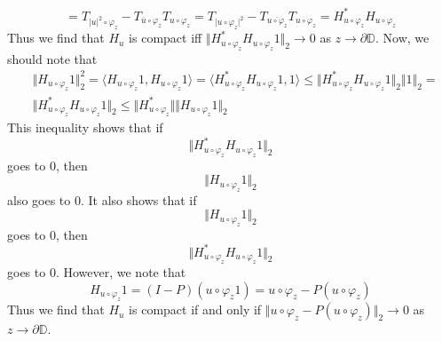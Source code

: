 \documentclass[12pt]{article}
\begin{document}
\[
= T_{\vert u \vert^2 \circ \varphi_z} - T_{\overline{u}\circ \varphi_z} T_{u \circ \varphi_z} = T_{\vert u \circ \varphi_z \vert^2} - T_{\overline{u \circ \varphi_z}} T_{u \circ \varphi_z} = H_{u \circ \varphi_z}^* H_{u \circ \varphi_z}
\] Thus we find that $H_u$ is compact iff $\Vert H_{u \circ \varphi_z}^* H_{u \circ \varphi_z} 1 \Vert_2 \rightarrow 0$ as $z \rightarrow \partial{\mathbb{D}}$. Now, we should note that
\begin{align*}
&\Vert H_{u \circ \varphi_z} 1 \Vert_2^2 = \langle H_{u \circ \varphi_z} 1, H_{u \circ \varphi_z} 1 \rangle = \langle H_{u \circ \varphi_z}^* H_{u \circ \varphi_z}  1, 1 \rangle \leq \Vert H_{u \circ \varphi_z}^* H_{u \circ \varphi_z} 1 \Vert_2 \Vert 1 \Vert_2 =\\
&\Vert H_{u \circ \varphi_z}^* H_{u \circ \varphi_z} 1 \Vert_2 \leq \Vert H_{u \circ \varphi_z}^* \Vert \Vert H_{u \circ \varphi_z} 1 \Vert_2 
\end{align*} This inequality shows that if 
\[
\Vert H_{u \circ \varphi_z}^* H_{u \circ \varphi_z} 1 \Vert_2 
\] goes to $0$, then
\[
\Vert H_{u \circ \varphi_z} 1 \Vert_2
\] also goes to $0$. It also shows that if 
\[
\Vert H_{u \circ \varphi_z} 1 \Vert_2
\] goes to $0$, then
\[
\Vert H_{u \circ \varphi_z}^* H_{u \circ \varphi_z} 1 \Vert_2
\] goes to $0$. However, we note that 
\[
H_{u \circ \varphi_z} 1 = (I-P)(u\circ \varphi_z 1) = u \circ \varphi_z - P(u \circ \varphi_z)
\] Thus we find that $H_u$ is compact if and only if $\Vert u \circ \varphi_z - P(u \circ \varphi_z) \Vert_2 \rightarrow 0$ as $z\rightarrow \partial{\mathbb{D}}$. 
\end{document}
